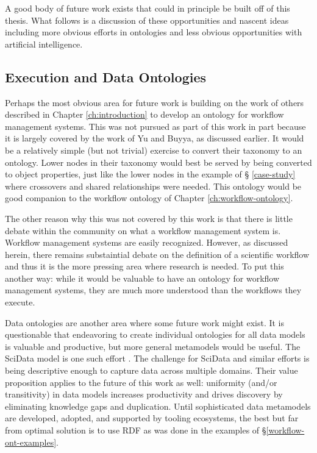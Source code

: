 A good body of future work exists that could in principle be built off of this
thesis. What follows is a discussion of these opportunities and nascent ideas
including more obvious efforts in ontologies and less obvious opportunities with
artificial intelligence.

\subsection{Execution and Data Ontologies}

Perhaps the most obvious area for future work is building on the work of others
described in Chapter \ref{ch:introduction} to develop an ontology for workflow
management systems. This was not pursued as part of this work in part because it
is largely covered by the work of Yu and Buyya, as discussed earlier. It would
be a relatively simple (but not trivial) exercise to convert their taxonomy to
an ontology. Lower nodes in their taxonomy would best be served by being
converted to object properties, just like the lower nodes in the example of \S
\ref{case-study} where crossovers and shared relationships were needed. This
ontology would be good companion to the workflow ontology of Chapter
\ref{ch:workflow-ontology}.

The other reason why this was not covered by this work is that there is little
debate within the community on what a workflow management system is. Workflow
management systems are easily recognized. However, as discussed herein, there
remains substaintial debate on the definition of a scientific workflow and thus
it is the more pressing area where research is needed. To put this another way:
while it would be valuable to have an ontology for workflow management systems,
they are much more understood than the workflows they execute.

Data ontologies are another area where some future work might exist. It is
questionable that endeavoring to create individual ontologies for all data
models is valuable and productive, but more general metamodels would be useful.
The SciData model is one such effort \cite{noauthor_scidata_nodate}. The
challenge for SciData and similar efforts is being descriptive enough to capture
data across multiple domains. Their value proposition applies to the future of
this work as well: uniformity (and/or transitivity) in data models increases
productivity and drives discovery by eliminating knowledge gaps and
duplication. Until sophisticated data metamodels are developed, adopted, and
supported by tooling ecosystems, the best but far from optimal solution is to
use RDF as was done in the examples of \S \ref{workflow-ont-examples}.

